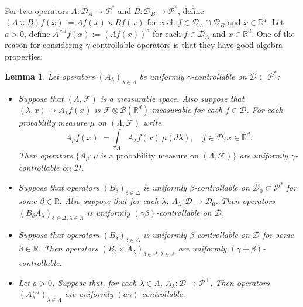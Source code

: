 \documentclass[12pt]{amsart}
\theoremstyle{plain}
\newtheorem{lem}[thm]{Lemma}
\theoremstyle{definition}
\numberwithin{equation}{section}
\begin{document}
	For two operators $A: \mathcal D_A \to \mathcal P^*$ and $B: \mathcal D_B \to \mathcal P^*$, define $(A\times B)f (x):= Af(x) \times Bf(x)$ for each $f\in \mathcal D_A \cap \mathcal D_B$ and $x\in \mathbb R^d$.
    Let $a > 0$, define $A^{\times a}f(x):= (Af(x))^a$ for each $f\in \mathcal D_A$ and $x\in \mathbb R^d$.
    One of the reason for considering $\gamma$-controllable operators is that they have good algebra properties:
\begin{lem}
\label{lem: property of controllable operators}
    Let operators $(A_\lambda)_{\lambda\in \Lambda}$ be uniformly $\gamma$-controllable on $\mathcal D \subset \mathcal P^*$:
\begin{itemize}
\item[(1)]
    Suppose that $(\Lambda, \mathscr F)$ is a measurable space.
    Also suppose that $(\lambda,x)\mapsto A_\lambda f(x)$ is $\mathscr F \otimes \mathscr B(\mathbb R^d)$-measurable for each $f\in \mathcal D$.
    For each probability measure $\mu$ on $(\Lambda, \mathscr F)$ write
\[
    A_\mu f(x):= \int_{\Lambda} A_\lambda f (x)~\mu(d\lambda), \quad f\in \mathcal D, x\in \mathbb R^d.
\]
    Then operators $\{A_\mu: \mu \text{ is  a probability measure on } (\Lambda, \mathscr F)\}$ are uniformly $\gamma$-controllable on $\mathcal D$.
\item[(2)]
    Suppose that operators $(B_\delta)_{\delta\in \Delta}$ is uniformly $\beta$-controllable on $\mathcal D_0 \subset \mathcal P^*$ for some $\beta \in \mathbb R$.
    Also suppose that for each $\lambda$, $A_\lambda:\mathcal D \to \mathcal D_0$.
    Then operators $(B_\delta A_\lambda)_{\delta\in \Delta, \lambda \in \Lambda}$ is uniformly $(\gamma\beta)$-controllable on $\mathcal D$.
\item[(3)]
    Suppose that operators $(B_\delta)_{\delta \in \Delta}$ is uniformly $\beta$-controllable on $\mathcal D$ for some $\beta\in \mathbb R$.
    Then operators $(B_\delta\times A_\lambda)_{\delta \in \Delta, \lambda \in \Lambda}$ are uniformly $(\gamma+\beta)$-controllable.
\item[(4)]
    Let $a>0$. Suppose that, for each $\lambda \in \Lambda$, $A_\lambda : \mathcal D \to \mathcal P^+$.
    Then operators $(A^{\times a}_\lambda)_{\lambda \in \Lambda}$ are uniformly $(a\gamma)$-controllable.
\end{itemize}
\end{lem}
\end{document}

